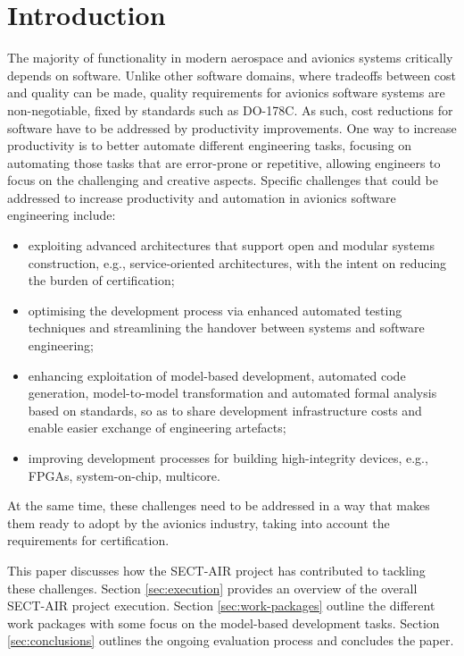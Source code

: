 \section{Introduction}
\label{sec:introduction}

The majority of functionality in modern aerospace and avionics systems critically depends on software. Unlike other software domains, where tradeoffs between cost and quality can be made, quality requirements for avionics software systems are non-negotiable, fixed by standards such as DO-178C. As such, cost reductions for software have to be addressed by productivity improvements. One way to increase productivity is to better automate different engineering tasks, focusing on automating those tasks that are error-prone or repetitive, allowing engineers to focus on the challenging and creative aspects. Specific challenges that could be addressed to increase productivity and automation in avionics software engineering include:
\begin{itemize}
\item exploiting advanced architectures that support open and modular systems construction, e.g., service-oriented architectures, with the intent on reducing the burden of certification;
\item optimising the development process via enhanced automated testing techniques and streamlining the handover between systems and software engineering;
\item enhancing exploitation of model-based development, automated code generation, model-to-model transformation and automated formal analysis based on standards, so as to share development infrastructure costs and enable easier exchange of engineering artefacts;
\item improving development processes for building high-integrity devices, e.g., FPGAs, system-on-chip, multicore.
\end{itemize}
At the same time, these challenges need to be addressed in a way that makes them ready to adopt by the avionics industry, taking into account the requirements for certification.

This paper discusses how the SECT-AIR project has contributed to tackling these challenges. 
Section \ref{sec:execution} provides an overview of the overall SECT-AIR project execution. Section \ref{sec:work-packages} outline the different work packages with some focus on the model-based development tasks. Section \ref{sec:conclusions} outlines the ongoing evaluation process and concludes the paper.

